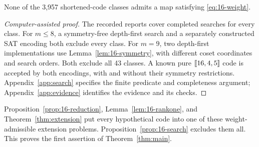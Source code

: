 \begin{proposition}\label{prop:16-search}
None of the 3,957 shortened-code classes admits a map satisfying
\eqref{eq:16-weight}.
\end{proposition}
\begin{proof}[Computer-assisted proof]
The recorded reports cover completed searches for every class.
For \(m\leq8\), a symmetry-free depth-first search and a separately
constructed SAT encoding both exclude every class. For \(m=9\), two
depth-first implementations use Lemma~\ref{lem:16-symmetry}, with
different coset coordinates and search orders. Both exclude all 43 classes.
A known pure \([\![16,4,5]\!]\) code is accepted by
both encodings, with and without their symmetry restrictions.
Appendix~\ref{app:search} specifies the finite predicate and completeness
argument; Appendix~\ref{app:evidence} identifies the evidence and its checks.
\end{proof}

Proposition~\ref{prop:16-reduction}, Lemma~\ref{lem:16-rankone}, and
Theorem~\ref{thm:extension} put every hypothetical code into one of these
weight-admissible extension problems. Proposition~\ref{prop:16-search}
excludes them all. This proves the first assertion of
Theorem~\ref{thm:main}.

